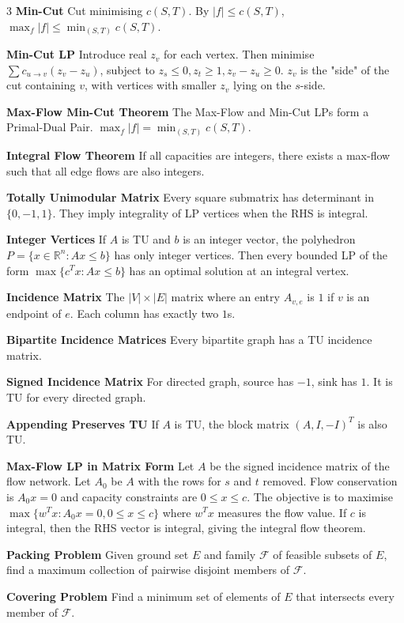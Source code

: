 \documentclass[10pt, landscape]{article}
\begin{document}
\begin{multicols*}{3}
\textbf{Min-Cut} Cut minimising $c(S, T)$. By $|f| \leq c(S, T)$, $\max_f|f| \leq \min_{(S,T)}c(S, T)$.

\textbf{Min-Cut LP} Introduce real $z_v$ for each vertex. Then minimise $\sum c_{u \rightarrow v}(z_v-z_u)$, subject to $z_s \leq 0, z_t \geq 1, z_v-z_u \geq 0$. $z_v$ is the "side" of the cut containing $v$, with vertices with smaller $z_v$ lying on the $s$-side.

\textbf{Max-Flow Min-Cut Theorem} The Max-Flow and Min-Cut LPs form a Primal-Dual Pair. $\max_f|f|=\min_{(S, T)}c(S, T)$.

\textbf{Integral Flow Theorem} If all capacities are integers, there exists a max-flow such that all edge flows are also integers.

\textbf{Totally Unimodular Matrix} Every square submatrix has determinant in $\{0,-1,1\}$. They imply integrality of LP vertices when the RHS is integral.

\textbf{Integer Vertices} If $A$ is TU and $b$ is an integer vector, the polyhedron $P=\{x \in \mathbb{R}^n:Ax\leq b\}$ has only integer vertices. Then every bounded LP of the form $\max\{c^Tx:Ax \leq b\}$ has an optimal solution at an integral vertex.

\textbf{Incidence Matrix} The $|V|\times |E|$ matrix where an entry $A_{v, e}$ is $1$ if $v$ is an endpoint of $e$. Each column has exactly two $1$s.

\textbf{Bipartite Incidence Matrices} Every bipartite graph has a TU incidence matrix.

\textbf{Signed Incidence Matrix} For directed graph, source has $-1$, sink has $1$. It is TU for every directed graph.

\textbf{Appending Preserves TU} If $A$ is TU, the block matrix $(A, I, -I)^T$ is also TU.

\textbf{Max-Flow LP in Matrix Form} Let $A$ be the signed incidence matrix of the flow network. Let $A_0$ be $A$ with the rows for $s$ and $t$ removed. Flow conservation is $A_0x=0$ and capacity constraints are $0 \leq x \leq c$. The objective is to maximise $\max\{w^Tx:A_0x=0, 0 \leq x \leq c\}$ where $w^Tx$ measures the flow value. If $c$ is integral, then the RHS vector is integral, giving the integral flow theorem.

\textbf{Packing Problem} Given ground set $E$ and family $\mathcal{F}$ of feasible subsets of $E$, find a maximum collection of pairwise disjoint members of $\mathcal{F}$.

\textbf{Covering Problem} Find a minimum set of elements of $E$ that intersects every member of $\mathcal{F}$.


\end{multicols*}
\end{document}

